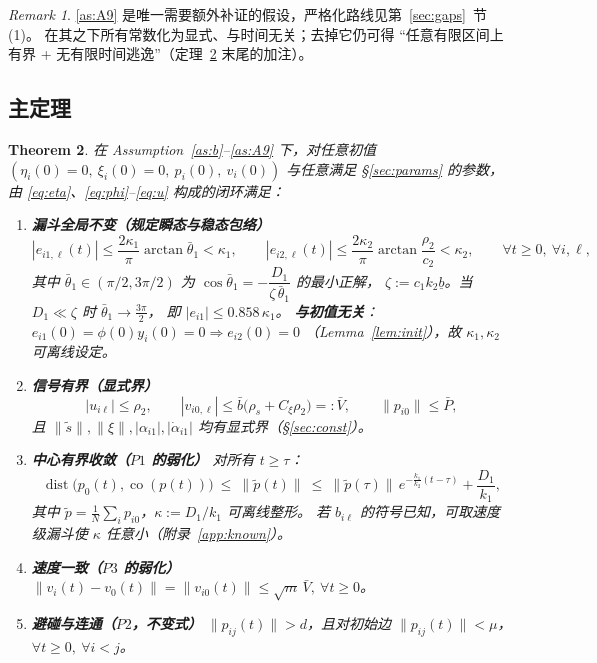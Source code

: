 \documentclass[11pt,a4paper]{article}
\newcommand{\ub}{\underline{b}}
\newcommand{\dist}{\operatorname{dist}}
\newcommand{\co}{\operatorname{co}}
\theoremstyle{plain}
\newtheorem{theorem}{Theorem}[section]
\theoremstyle{definition}
\theoremstyle{remark}
\newtheorem{remark}[theorem]{Remark}
\begin{document}
\begin{remark}\label{rem:A9}
\ref{as:A9} 是唯一需要额外补证的假设，严格化路线见第~\ref{sec:gaps}~节 (1)。
在其之下所有常数化为显式、与时间无关；去掉它仍可得
“任意有限区间上有界 + 无有限时间逃逸”（定理~\ref{thm:main} 末尾的加注）。
\end{remark}

\subsection{主定理}
\begin{theorem}\label{thm:main}
在 Assumption~\ref{as:b}--\ref{as:A9} 下，对任意初值
$(\eta_i(0)=0,\ \xi_i(0)=0,\ p_i(0),\ v_i(0))$ 与任意满足 §\ref{sec:params} 的参数，
由 \eqref{eq:eta}、\eqref{eq:phi}--\eqref{eq:u} 构成的闭环满足：
\begin{enumerate}[label=\textup{(\roman*)}]
\item \textbf{漏斗全局不变（规定瞬态与稳态包络）}
\begin{equation*}
|e_{i1,\ell}(t)|\le\frac{2\kappa_1}{\pi}\arctan\bar\theta_1<\kappa_1,
\qquad
|e_{i2,\ell}(t)|\le\frac{2\kappa_2}{\pi}\arctan\frac{\rho_2}{c_2}<\kappa_2,
\qquad \forall t\ge0,\ \forall i,\ell,
\end{equation*}
其中 $\bar\theta_1\in(\pi/2,3\pi/2)$ 为
$\cos\bar\theta_1=-\dfrac{D_1}{\zeta\,\bar\theta_1}$ 的最小正解，
$\zeta:=c_1k_2\ub$。当 $D_1\ll\zeta$ 时 $\bar\theta_1\to\frac{3\pi}{2}$，
即 $|e_{i1}|\le0.858\,\kappa_1$。
\textbf{与初值无关}：$e_{i1}(0)=\phi(0)y_i(0)=0\Rightarrow e_{i2}(0)=0$
（Lemma~\ref{lem:init}），故 $\kappa_1,\kappa_2$ 可\emph{离线}设定。

\item \textbf{信号有界（显式界）}
\begin{equation*}
|u_{i\ell}|\le\rho_2,\qquad
|v_{i0,\ell}|\le\bar b\bigl(\rho_s+C_\xi\rho_2\bigr)=:\bar V,\qquad
\|p_{i0}\|\le\bar P ,
\end{equation*}
且 $\|\tilde s\|,\|\xi\|,|\alpha_{i1}|,|\dot\alpha_{i1}|$ 均有显式界（§\ref{sec:const}）。

\item \textbf{中心有界收敛（$P1$ 的弱化）} 对所有 $t\ge\tau$：
\begin{equation}
\dist\bigl(p_0(t),\co(p(t))\bigr)\ \le\ \|\tilde p(t)\|
\ \le\ \|\tilde p(\tau)\|\,e^{-\frac{k_1}{k_2}(t-\tau)}
+\frac{D_1}{k_1},
\label{eq:kappa}\tag{3.1}
\end{equation}
其中 $\tilde p=\frac1N\sum_ip_{i0}$，$\kappa:=D_1/k_1$ 可离线整形。
若 $b_{i\ell}$ 的符号已知，可取速度级漏斗使 $\kappa$ 任意小（附录~\ref{app:known}）。

\item \textbf{速度一致（$P3$ 的弱化）}
$\|v_i(t)-v_0(t)\|=\|v_{i0}(t)\|\le\sqrt m\,\bar V,\ \forall t\ge0$。

\item \textbf{避碰与连通（$P2$，不变式）}
$\|p_{ij}(t)\|>d$，且对初始边 $\|p_{ij}(t)\|<\mu$，$\forall t\ge0,\ \forall i<j$。
\end{enumerate}
\end{theorem}
\end{document}
